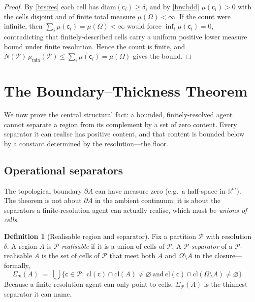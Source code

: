 \documentclass[11pt,twocolumn,a4paper]{article}
\theoremstyle{thmstyle}
\theoremstyle{definition}
\newtheorem{definition}[theorem]{Definition}
\theoremstyle{remark}
\newcommand{\R}{\mathbb{R}}
\newcommand{\Space}{\Omega}
\newcommand{\Bdy}{\partial}
\newcommand{\cl}{\mathrm{cl}}
\newcommand{\diam}{\mathrm{diam}}
\newcommand{\reso}{\delta}
\newcommand{\Part}{\mathscr{P}}
\newcommand{\cell}{\mathsf{c}}
\begin{document}
\begin{proof}
By \ref{brs:res} each cell has $\diam(\cell_i)\ge\reso$, and by
\ref{brs:bdd} $\mu(\cell_i)>0$ with the cells disjoint and of finite total
measure $\mu(\Space)<\infty$. If the count were infinite, then
$\sum_i\mu(\cell_i)=\mu(\Space)<\infty$ would force
$\inf_i\mu(\cell_i)=0$, contradicting that finitely-described cells carry a
uniform positive lower measure bound under finite resolution. Hence the count
is finite, and $N(\Part)\,\mu_{\min}(\Part)\le\sum_i\mu(\cell_i)=\mu(\Space)$
gives the bound.
\end{proof}


\section{The Boundary--Thickness Theorem}
\label{sec:thickness}

We now prove the central structural fact: a bounded, finitely-resolved agent
cannot separate a region from its complement by a set of zero content. Every
separator it can realise has positive content, and that content is bounded
below by a constant determined by the resolution---the floor.

\subsection{Operational separators}

The topological boundary $\Bdy A$ can have measure zero (e.g.\ a half-space in
$\R^m$). The theorem is not about $\Bdy A$ in the ambient continuum; it is about
the separators a finite-resolution agent can actually realise, which must be
\emph{unions of cells}.

\begin{definition}[Realisable region and separator]
\label{def:realisable}
Fix a partition $\Part$ with resolution $\reso$. A region $A$ is
\emph{$\Part$-realisable} if it is a union of cells of $\Part$. A
\emph{$\Part$-separator} of a $\Part$-realisable $A$ is the set of cells of
$\Part$ that meet both $A$ and $\Space\setminus A$ in the closure---formally,
\[
\Sigma_\Part(A)\;=\;\bigcup\bigl\{\cell\in\Part:\ \cl(\cell)\cap\cl(A)\neq\varnothing
\ \text{and}\ \cl(\cell)\cap\cl(\Space\setminus A)\neq\varnothing\bigr\}.
\]
Because a finite-resolution agent can only point to cells, $\Sigma_\Part(A)$ is
the thinnest separator it can name.
\end{definition}
\end{document}
